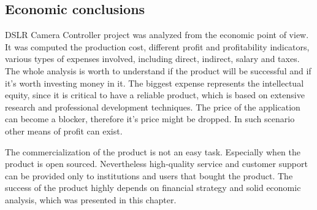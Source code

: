 \subsection{Economic conclusions}
DSLR Camera Controller project was analyzed from the economic point of view. It was computed the production cost, different profit and profitability indicators, various types of expenses involved, including direct, indirect, salary and taxes. The whole analysis is worth to understand if the product will be successful and if it's worth investing money in it. The biggest expense represents the intellectual equity, since it is critical to have a reliable product, which is based on extensive research and professional development techniques. The price of the application can become a blocker, therefore it's price might be dropped. In such scenario other means of profit can exist.

The commercialization of the product is not an easy task. Especially when the product is open sourced. Nevertheless high-quality service and customer support can be provided only to institutions and users that bought the product. The success of the product highly depends on financial strategy and solid economic analysis, which was presented in this chapter.
